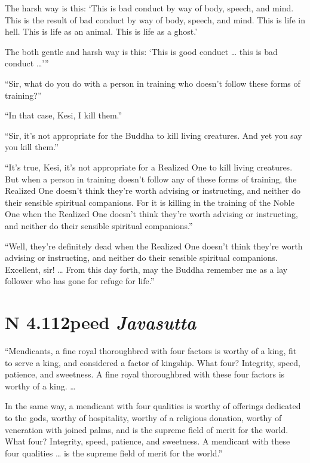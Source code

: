 \documentclass[12pt,openany]{book}%
\newcommand*{\suttatitleacronym}[1]{\smaller[2]{#1}\vspace*{.3em}}
\newcommand*{\suttatitletranslation}[1]{\linebreak{#1}}
\newcommand*{\suttatitleroot}[1]{\linebreak\smaller[2]\itshape{#1}}
\newcommand*{\tocacronym}[1]{\hspace*{-3.3em}{#1}\quad}
\newcommand*{\toctranslation}[1]{#1}
\newcommand*{\tocroot}[1]{(\textit{#1})}
\begin{document}
The harsh way is this: ‘This is bad conduct by way of body, speech, and mind. This is the result of bad conduct by way of body, speech, and mind. This is life in hell. This is life as an animal. This is life as a ghost.’ 

The both gentle and harsh way is this: ‘This is good conduct … this is bad conduct …’” 

“Sir, what do you do with a person in training who doesn’t follow these forms of training?” 

“In that case, Kesi, I kill them.” 

“Sir, it’s not appropriate for the Buddha to kill living creatures. And yet you say you kill them.” 

“It’s true, Kesi, it’s not appropriate for a Realized One to kill living creatures. But when a person in training doesn’t follow any of these forms of training, the Realized One doesn’t think they’re worth advising or instructing, and neither do their sensible spiritual companions. For it is killing in the training of the Noble One when the Realized One doesn’t think they’re worth advising or instructing, and neither do their sensible spiritual companions.” 

“Well, they’re definitely dead when the Realized One doesn’t think they’re worth advising or instructing, and neither do their sensible spiritual companions. Excellent, sir! … From this day forth, may the Buddha remember me as a lay follower who has gone for refuge for life.” 

%
\section*{{\suttatitleacronym AN 4.112}{\suttatitletranslation Speed }{\suttatitleroot Javasutta}}
\addcontentsline{toc}{section}{\tocacronym{AN 4.112} \toctranslation{Speed } \tocroot{Javasutta}}

“Mendicants, a fine royal thoroughbred with four factors is worthy of a king, fit to serve a king, and considered a factor of kingship. What four? Integrity, speed, patience, and sweetness. A fine royal thoroughbred with these four factors is worthy of a king. … 

In the same way, a mendicant with four qualities is worthy of offerings dedicated to the gods, worthy of hospitality, worthy of a religious donation, worthy of veneration with joined palms, and is the supreme field of merit for the world. What four? Integrity, speed, patience, and sweetness. A mendicant with these four qualities … is the supreme field of merit for the world.” 
\end{document}
